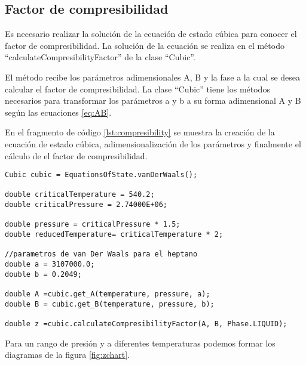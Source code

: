\subsection{Factor de compresibilidad}\label{subsec:compresibilityFactor}

Es necesario realizar la solución de la ecuación de estado cúbica para conocer el factor de compresibilidad. La solución de la ecuación se realiza en el método ``calculateCompresibilityFactor'' de la clase ``Cubic''.

El método recibe los parámetros adimensionales A, B y la fase a la cual se desea calcular el factor de compresibilidad. La clase ``Cubic'' tiene los métodos necesarios para transformar los parámetros a y b a su forma adimensional A y B según las ecuaciones \ref{eq:AB}.

En el fragmento de código \ref{lst:compresibility} se muestra la creación de la ecuación de estado cúbica, adimensionalización de los parámetros y finalmente el cálculo de el factor de compresibilidad.

\begin{lstlisting}[label=lst:compresibility,caption={Cálculo del factor de compresibilidad, y adimensionamiento de los parámetros a y b con la clase ``Cubic''}]
Cubic cubic = EquationsOfState.vanDerWaals();
		
double criticalTemperature = 540.2;
double criticalPressure = 2.74000E+06;

double pressure = criticalPressure * 1.5;
double reducedTemperature= criticalTemperature * 2;

//parametros de van Der Waals para el heptano
double a = 3107000.0;
double b = 0.2049;

double A =cubic.get_A(temperature, pressure, a);
double B = cubic.get_B(temperature, pressure, b);

double z =cubic.calculateCompresibilityFactor(A, B, Phase.LIQUID);
\end{lstlisting}
 
	Para un rango de presión y a diferentes temperaturas podemos formar los diagramas de la figura \ref{fig:zchart}.

